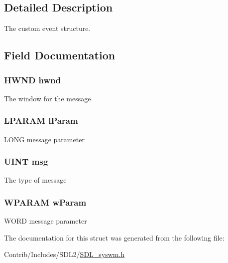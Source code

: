 \subsection{Detailed Description}
The custom event structure. 

\subsection{Field Documentation}
\subsubsection[{\texorpdfstring{hwnd}{hwnd}}]{\setlength{\rightskip}{0pt plus 5cm}H\+W\+ND hwnd}\hypertarget{struct_s_d_l___sys_w_mmsg_aa72255e7356d612ad72bb45def01fcbb}{}\label{struct_s_d_l___sys_w_mmsg_aa72255e7356d612ad72bb45def01fcbb}
The window for the message 
\subsubsection[{\texorpdfstring{l\+Param}{lParam}}]{\setlength{\rightskip}{0pt plus 5cm}L\+P\+A\+R\+AM l\+Param}\hypertarget{struct_s_d_l___sys_w_mmsg_a6502a620e85496eb7a57b0097af61a83}{}\label{struct_s_d_l___sys_w_mmsg_a6502a620e85496eb7a57b0097af61a83}
L\+O\+NG message parameter 
\subsubsection[{\texorpdfstring{msg}{msg}}]{\setlength{\rightskip}{0pt plus 5cm}U\+I\+NT msg}\hypertarget{struct_s_d_l___sys_w_mmsg_a43204af3a61671f6c669bf2539b7475f}{}\label{struct_s_d_l___sys_w_mmsg_a43204af3a61671f6c669bf2539b7475f}
The type of message 
\subsubsection[{\texorpdfstring{w\+Param}{wParam}}]{\setlength{\rightskip}{0pt plus 5cm}W\+P\+A\+R\+AM w\+Param}\hypertarget{struct_s_d_l___sys_w_mmsg_a2c28a497a9b541541d5b8713a639a31b}{}\label{struct_s_d_l___sys_w_mmsg_a2c28a497a9b541541d5b8713a639a31b}
W\+O\+RD message parameter 

The documentation for this struct was generated from the following file\+:\begin{DoxyCompactItemize}
\item 
Contrib/\+Includes/\+S\+D\+L2/\hyperlink{_s_d_l__syswm_8h}{S\+D\+L\+\_\+syswm.\+h}\end{DoxyCompactItemize}
